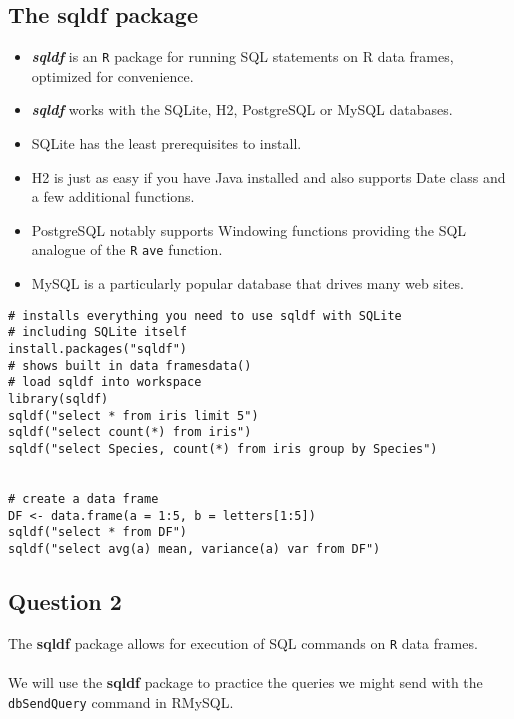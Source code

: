 \documentclass[12pt]{article}
\begin{document}
\subsection*{The sqldf package}
\begin{itemize}
\item \textbf{\textit{ sqldf}} is an \texttt{R} package for running SQL statements on R data frames, optimized for convenience. 

\item \textbf{\textit{sqldf}} works with the SQLite, H2, PostgreSQL or MySQL databases. 

\item SQLite has the least prerequisites to install. 
\item H2 is just as easy if you have Java installed and also supports Date class and a few additional functions. 

\item PostgreSQL notably supports Windowing functions providing the SQL analogue of the \texttt{R} \texttt{ave} function. 

\item MySQL is a particularly popular database that drives many web sites. 

\end{itemize}
\begin{framed}
\begin{verbatim}
# installs everything you need to use sqldf with SQLite
# including SQLite itself
install.packages("sqldf")
# shows built in data framesdata() 
# load sqldf into workspace
library(sqldf)
sqldf("select * from iris limit 5")
sqldf("select count(*) from iris")
sqldf("select Species, count(*) from iris group by Species")


# create a data frame
DF <- data.frame(a = 1:5, b = letters[1:5])
sqldf("select * from DF")
sqldf("select avg(a) mean, variance(a) var from DF")
\end{verbatim}
\end{framed}
\newpage
\subsection*{Question 2}
The \textbf{sqldf} package allows for execution of SQL commands on \texttt{R} data frames. \\\\ \noindent We will use the \textbf{sqldf} package to practice the queries we might send with the \texttt{dbSendQuery} command in RMySQL. 
\end{document}
